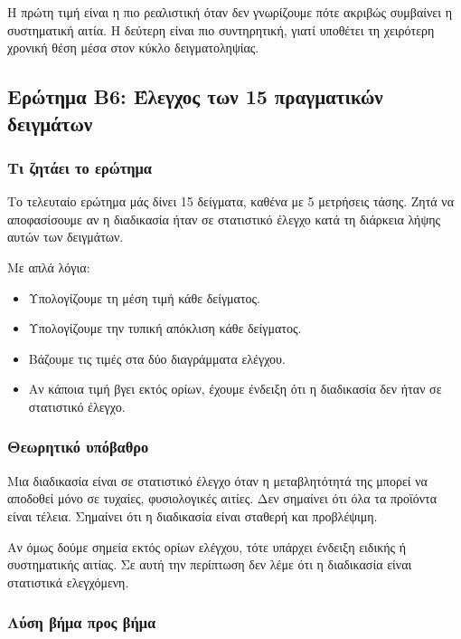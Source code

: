\documentclass[12pt,a4paper]{article}
\begin{document}
Η πρώτη τιμή είναι η πιο ρεαλιστική όταν δεν γνωρίζουμε πότε ακριβώς συμβαίνει
η συστηματική αιτία. Η δεύτερη είναι πιο συντηρητική, γιατί υποθέτει τη
χειρότερη χρονική θέση μέσα στον κύκλο δειγματοληψίας.

\subsection{Ερώτημα Β6: Έλεγχος των 15 πραγματικών δειγμάτων}

\subsubsection*{Τι ζητάει το ερώτημα}

Το τελευταίο ερώτημα μάς δίνει 15 δείγματα, καθένα με 5 μετρήσεις τάσης. Ζητά
να αποφασίσουμε αν η διαδικασία ήταν σε στατιστικό έλεγχο κατά τη διάρκεια
λήψης αυτών των δειγμάτων.

Με απλά λόγια:

\begin{itemize}
    \item Υπολογίζουμε τη μέση τιμή κάθε δείγματος.
    \item Υπολογίζουμε την τυπική απόκλιση κάθε δείγματος.
    \item Βάζουμε τις τιμές στα δύο διαγράμματα ελέγχου.
    \item Αν κάποια τιμή βγει εκτός ορίων, έχουμε ένδειξη ότι η διαδικασία δεν
    ήταν σε στατιστικό έλεγχο.
\end{itemize}

\subsubsection*{Θεωρητικό υπόβαθρο}

Μια διαδικασία είναι σε στατιστικό έλεγχο όταν η μεταβλητότητά της μπορεί να
αποδοθεί μόνο σε τυχαίες, φυσιολογικές αιτίες. Δεν σημαίνει ότι όλα τα προϊόντα
είναι τέλεια. Σημαίνει ότι η διαδικασία είναι σταθερή και προβλέψιμη.

Αν όμως δούμε σημεία εκτός ορίων ελέγχου, τότε υπάρχει ένδειξη ειδικής ή
συστηματικής αιτίας. Σε αυτή την περίπτωση δεν λέμε ότι η διαδικασία είναι
στατιστικά ελεγχόμενη.

\subsubsection*{Λύση βήμα προς βήμα}
\end{document}
